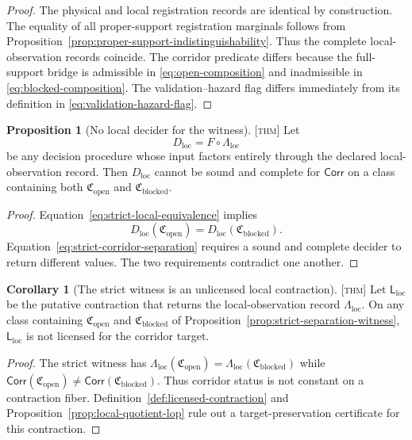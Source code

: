 \documentclass[11pt]{article}
\newcommand{\LOp}{\ensuremath{\mathsf{L}}}
\newcommand{\Thm}{\textsc{[thm]}}
\theoremstyle{definition}
\newtheorem{sproposition}{Proposition}
\newtheorem{scorollary}[sdefinition]{Corollary}
\begin{document}
\begin{proof}
The physical and local registration records are identical by construction. The
equality of all proper-support registration marginals follows from
Proposition~\ref{prop:proper-support-indistinguishability}. Thus the complete
local-observation records coincide. The corridor predicate differs because the
full-support bridge is admissible in \eqref{eq:open-composition} and inadmissible
in \eqref{eq:blocked-composition}. The validation--hazard flag differs immediately
from its definition in \eqref{eq:validation-hazard-flag}.
\end{proof}

\begin{sproposition}[No local decider for the witness]
\label{prop:no-local-decider}
\Thm{} Let
\begin{equation}
D_{\mathrm{loc}}=F\circ\Lambda_{\mathrm{loc}}
\label{eq:local-decider}
\end{equation}
be any decision procedure whose input factors entirely through the declared
local-observation record. Then $D_{\mathrm{loc}}$ cannot be sound and complete
for $\mathsf{Corr}$ on a class containing both
$\mathfrak C_{\mathrm{open}}$ and $\mathfrak C_{\mathrm{blocked}}$.
\end{sproposition}

\begin{proof}
Equation~\eqref{eq:strict-local-equivalence} implies
\begin{equation}
D_{\mathrm{loc}}(\mathfrak C_{\mathrm{open}})
=
D_{\mathrm{loc}}(\mathfrak C_{\mathrm{blocked}}).
\end{equation}
Equation~\eqref{eq:strict-corridor-separation} requires a sound and complete
decider to return different values. The two requirements contradict one another.
\end{proof}

\begin{scorollary}[The strict witness is an unlicensed local contraction]
\label{cor:strict-witness-unlicensed-contraction}
\Thm{} Let $\LOp_{\mathrm{loc}}$ be the putative contraction that returns the
local-observation record $\Lambda_{\mathrm{loc}}$. On any class containing
$\mathfrak C_{\mathrm{open}}$ and $\mathfrak C_{\mathrm{blocked}}$ of
Proposition~\ref{prop:strict-separation-witness},
$\LOp_{\mathrm{loc}}$ is not licensed for the corridor target.
\end{scorollary}

\begin{proof}
The strict witness has
$\Lambda_{\mathrm{loc}}(\mathfrak C_{\mathrm{open}})=
\Lambda_{\mathrm{loc}}(\mathfrak C_{\mathrm{blocked}})$ while
$\mathsf{Corr}(\mathfrak C_{\mathrm{open}})\neq
\mathsf{Corr}(\mathfrak C_{\mathrm{blocked}})$. Thus corridor status is not
constant on a contraction fiber. Definition~\ref{def:licensed-contraction} and
Proposition~\ref{prop:local-quotient-lop} rule out a target-preservation
certificate for this contraction.
\end{proof}
\end{document}
